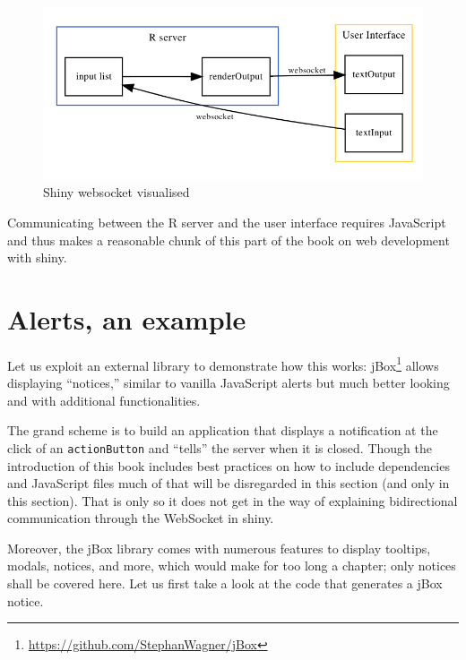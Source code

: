 \documentclass[
  10pt,
]{krantz}
\renewcommand{\href}[2]{#2\footnote{\url{#1}}}
\begin{document}
\begin{figure}[H]

{\centering \includegraphics[width=1\linewidth]{images/04-shiny-websocket} 

}

\caption{Shiny websocket visualised}\label{fig:shiny-websocket-diagram}
\end{figure}

Communicating between the R server and the user interface requires JavaScript and thus makes a reasonable chunk of this part of the book on web development with shiny.

\hypertarget{shiny-intro-example}{%
\section{Alerts, an example}\label{shiny-intro-example}}

Let us exploit an external library to demonstrate how this works: \href{https://github.com/StephanWagner/jBox}{jBox} allows displaying ``notices,'' similar to vanilla JavaScript alerts but much better looking and with additional functionalities.

The grand scheme is to build an application that displays a notification at the click of an \texttt{actionButton} and ``tells'' the server when it is closed. Though the introduction of this book includes best practices on how to include dependencies and JavaScript files much of that will be disregarded in this section (and only in this section). That is only so it does not get in the way of explaining bidirectional communication through the WebSocket in shiny.

Moreover, the jBox library comes with numerous features to display tooltips, modals, notices, and more, which would make for too long a chapter; only notices shall be covered here. Let us first take a look at the code that generates a jBox notice.
\end{document}

